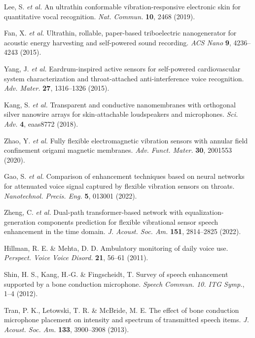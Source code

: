 \documentclass[10pt]{wlscirep}
\begin{document}
\begin{thebibliography}{99}
Lee, S. \textit{et al.} An ultrathin conformable vibration-responsive electronic skin for quantitative vocal recognition.
\textit{Nat. Commun.} \textbf{10}, 2468 (2019).

Fan, X. \textit{et al.} Ultrathin, rollable, paper-based triboelectric nanogenerator for acoustic energy harvesting and self-powered sound recording.
\textit{ACS Nano} \textbf{9}, 4236–4243 (2015).

Yang, J. \textit{et al.} Eardrum-inspired active sensors for self-powered cardiovascular system characterization and throat-attached anti-interference voice recognition.
\textit{Adv. Mater.} \textbf{27}, 1316–1326 (2015).

Kang, S. \textit{et al.} Transparent and conductive nanomembranes with orthogonal silver nanowire arrays for skin-attachable loudspeakers and microphones.
\textit{Sci. Adv.} \textbf{4}, eaas8772 (2018).

Zhao, Y. \textit{et al.} Fully flexible electromagnetic vibration sensors with annular field confinement origami magnetic membranes.
\textit{Adv. Funct. Mater.} \textbf{30}, 2001553 (2020).

Gao, S. \textit{et al.} Comparison of enhancement techniques based on neural networks for attenuated voice signal captured by flexible vibration sensors on throats.
\textit{Nanotechnol. Precis. Eng.} \textbf{5}, 013001 (2022).

Zheng, C. \textit{et al.} Dual-path transformer-based network with equalization-generation components prediction for flexible vibrational sensor speech enhancement in the time domain.
\textit{J. Acoust. Soc. Am.} \textbf{151}, 2814–2825 (2022).

Hillman, R. E. \& Mehta, D. D. Ambulatory monitoring of daily voice use.
\textit{Perspect. Voice Voice Disord.} \textbf{21}, 56–61 (2011).

Shin, H. S., Kang, H.-G. \& Fingscheidt, T. Survey of speech enhancement supported by a bone conduction microphone.
\textit{Speech Commun. 10. ITG Symp.}, 1–4 (2012).

Tran, P. K., Letowski, T. R. \& McBride, M. E. The effect of bone conduction microphone placement on intensity and spectrum of transmitted speech items.
\textit{J. Acoust. Soc. Am.} \textbf{133}, 3900–3908 (2013).



\end{thebibliography}
\end{document}

